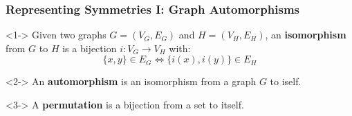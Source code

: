 \documentclass{beamer}
\begin{document}
\begin{frame}
  \frametitle{Representing Symmetries I: Graph Automorphisms}

  \begin{definition}<1->
    Given two graphs $G = (V_G, E_G)$ and $H = (V_H, E_H)$, an
    \textbf{isomorphism} from $G$ to $H$ is a bijection $i: V_G \rightarrow V_H$
    with:
    $$
      \{x,y\} \in E_G \Leftrightarrow \{i(x),i(y)\} \in E_H
    $$
  \end{definition}

  \begin{definition}<2->
    An \textbf{automorphism} is an isomorphism from a graph $G$ to iself.
  \end{definition}

  \begin{definition}<3->
    A \textbf{permutation} is a bijection from a set to itself.
  \end{definition}
\end{frame}
\end{document}
